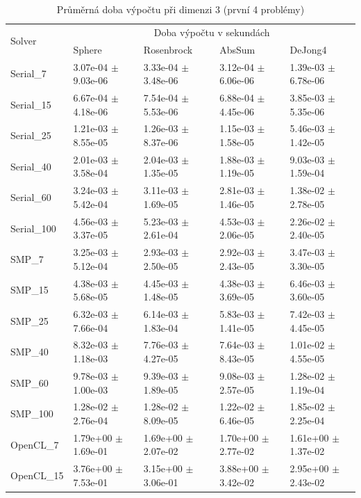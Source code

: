 \documentclass[12pt, a4paper]{report}
\begin{document}
\begin{table}
	\scriptsize
	\caption{Průměrná doba výpočtu při dimenzi 3 (první 4 problémy)}
	\centering
	\label{tbl:time3}
	\begin{tabular}{l|l|l|l|l}
		\multirow{2}{*}{Solver} & \multicolumn{4}{c}{Doba výpočtu v sekundách} \\
		& Sphere & Rosenbrock & AbsSum & DeJong4 \\
		\hline
		\hline
		Serial\_7 & 3.07e-04 $\pm$ 9.03e-06 & 3.33e-04 $\pm$ 3.48e-06 & 3.12e-04 $\pm$ 6.06e-06 & 1.39e-03 $\pm$ 6.78e-06 \\
		Serial\_15 & 6.67e-04 $\pm$ 4.18e-06 & 7.54e-04 $\pm$ 5.53e-06 & 6.88e-04 $\pm$ 4.45e-06 & 3.85e-03 $\pm$ 5.35e-06 \\
		Serial\_25 & 1.21e-03 $\pm$ 8.55e-05 & 1.26e-03 $\pm$ 8.37e-06 & 1.15e-03 $\pm$ 1.58e-05 & 5.46e-03 $\pm$ 1.42e-05 \\
		Serial\_40 & 2.01e-03 $\pm$ 3.58e-04 & 2.04e-03 $\pm$ 1.35e-05 & 1.88e-03 $\pm$ 1.19e-05 & 9.03e-03 $\pm$ 1.59e-04 \\
		Serial\_60 & 3.24e-03 $\pm$ 5.42e-04 & 3.11e-03 $\pm$ 1.69e-05 & 2.81e-03 $\pm$ 1.46e-05 & 1.38e-02 $\pm$ 2.78e-05 \\
		Serial\_100 & 4.56e-03 $\pm$ 3.37e-05 & 5.23e-03 $\pm$ 2.61e-04 & 4.53e-03 $\pm$ 2.06e-05 & 2.26e-02 $\pm$ 2.40e-05 \\
		\hline
		SMP\_7 & 3.25e-03 $\pm$ 5.12e-04 & 2.93e-03 $\pm$ 2.50e-05 & 2.92e-03 $\pm$ 2.43e-05 & 3.47e-03 $\pm$ 3.30e-05 \\
		SMP\_15 & 4.38e-03 $\pm$ 5.68e-05 & 4.45e-03 $\pm$ 1.48e-05 & 4.38e-03 $\pm$ 3.69e-05 & 6.46e-03 $\pm$ 3.60e-05 \\
		SMP\_25 & 6.32e-03 $\pm$ 7.66e-04 & 6.14e-03 $\pm$ 1.83e-04 & 5.83e-03 $\pm$ 1.41e-05 & 7.42e-03 $\pm$ 4.45e-05 \\
		SMP\_40 & 8.32e-03 $\pm$ 1.18e-03 & 7.76e-03 $\pm$ 4.27e-05 & 7.64e-03 $\pm$ 8.43e-05 & 1.01e-02 $\pm$ 4.55e-05 \\
		SMP\_60 & 9.78e-03 $\pm$ 1.00e-03 & 9.39e-03 $\pm$ 1.89e-05 & 9.08e-03 $\pm$ 2.57e-05 & 1.28e-02 $\pm$ 1.19e-04 \\
		SMP\_100 & 1.28e-02 $\pm$ 2.76e-04 & 1.28e-02 $\pm$ 8.09e-05 & 1.22e-02 $\pm$ 6.46e-05 & 1.85e-02 $\pm$ 2.25e-04 \\
		\hline
		OpenCL\_7 & 1.79e+00 $\pm$ 1.69e-01 & 1.69e+00 $\pm$ 2.07e-02 & 1.70e+00 $\pm$ 2.77e-02 & 1.61e+00 $\pm$ 1.37e-02 \\
		OpenCL\_15 & 3.76e+00 $\pm$ 7.53e-01 & 3.15e+00 $\pm$ 3.06e-01 & 3.88e+00 $\pm$ 3.42e-02 & 2.95e+00 $\pm$ 2.43e-02 \\

\end{tabular}
\end{table}
\end{document}
